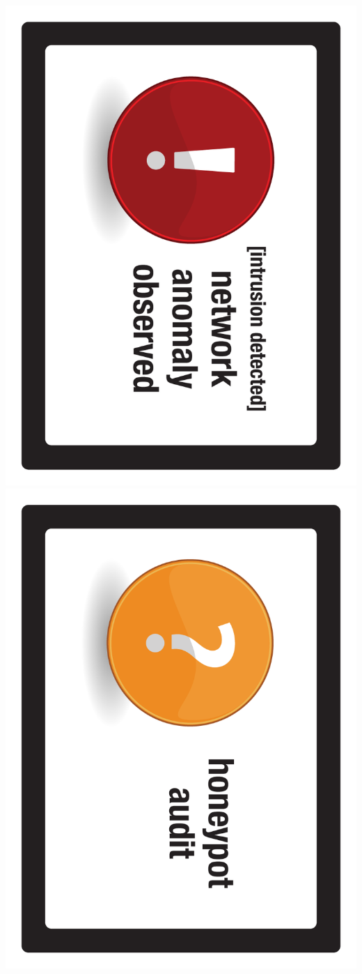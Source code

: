 \documentclass{letter}
\begin{document}
\includegraphics{lo0t/lo0t.detection_net_anomaly}
\includegraphics{lo0t/lo0t.detection_honeypot_audit}
\end{document}
